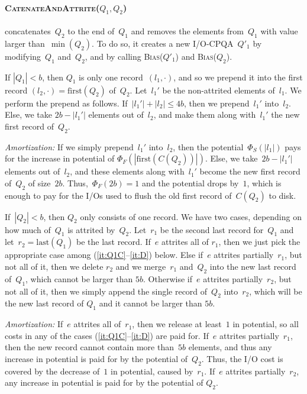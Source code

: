 \documentclass[]{article}
\newcommand{\first}{\text{first}}
\newcommand{\last}{\text{last}}
\begin{document}
\paragraph{\textsc{CatenateAndAttrite}($Q_1, Q_2$)} concatenates~$Q_2$ to the
end of~$Q_1$ and removes the elements from~$Q_1$ with value larger
than~$\min(Q_2)$. To do so, it creates a new I/O-CPQA~$Q'_1$ by modifying~$Q_1$
and~$Q_2$, and by calling \textsc{Bias}($Q'_1$) and \textsc{Bias}($Q_2$).

If $|Q_1| < b$, then $Q_1$ is only one record~$(l_1,\cdot)$, and so we prepend
it into the first record $(l_2,\cdot) = \first(Q_2)$ of~$Q_2$.  Let~$l_1'$ be
the non-attrited elements of~$l_1$. We perform the prepend as follows.
If~$|l_1'| + |l_2| \leq 4b$, then we prepend~$l_1'$ into~$l_2$. Else, we take
$2b - |l_1'|$ elements out of~$l_2$, and make them along with~$l_1'$ the new
first record of~$Q_2$.

\noindent \textit{Amortization:} If we simply prepend~$l_1'$ into~$l_2$, then
the potential~$\Phi_S(|l_1|)$ pays for the increase in potential of
$\Phi_F(|\first(C(Q_2))|)$. Else, we take~$2b - |l_1'|$ elements out of~$l_2$,
and these elements along with~$l_1'$ become the new first record of~$Q_2$ of
size~$2b$. Thus,~$\Phi_F(2b) = 1$ and the potential drops by~$1$, which is
enough to pay for the I/Os used to flush the old first record of~$C(Q_2)$ to
disk.

\noindent If~$|Q_2| < b$, then $Q_2$ only consists of one record. We have two
cases, depending on how much of~$Q_1$ is attrited by~$Q_2$. Let~$r_1$ be the
second last record for~$Q_1$ and let~$r_2 = \last(Q_1)$ be the last record.
If~$e$ attrites all of $r_1$, then we just pick the appropriate case among
(\ref{it:Q1C}--\ref{it:D}) below. Else if~$e$ attrites partially~$r_1$, but not
all of it, then we delete $r_2$ and we merge~$r_1$ and~$Q_2$ into the new last
record of~$Q_1$, which cannot be larger than $5b$. Otherwise if~$e$ attrites
partially~$r_2$, but not all of it, then we simply append the single record
of~$Q_2$ into~$r_2$, which will be the new last record of $Q_1$ and it cannot be
larger than $5b$.

\noindent \textit{Amortization:} If~$e$ attrites all of~$r_1$, then we release
at least~$1$ in potential, so all costs in any of the cases
(\ref{it:Q1C}--\ref{it:D}) are paid for. If~$e$ attrites partially~$r_1$, then
the new record cannot contain more than~$5b$ elements, and thus any increase in
potential is paid for by the potential of~$Q_2$. Thus, the I/O cost is covered
by the decrease of~$1$ in potential, caused by~$r_1$. If~$e$ attrites
partially~$r_2$, any increase in potential is paid for by the potential of
$Q_2$.
\end{document}
